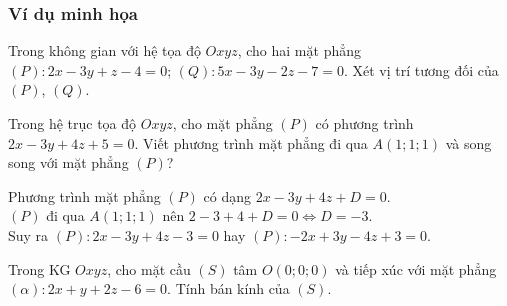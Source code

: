 \subsubsection{Ví dụ minh họa}
\begin{vd}%
	Trong không gian với hệ tọa độ $ Oxyz $, cho hai mặt phẳng $ (P)\colon 2x-3y+z-4=0 $; $ (Q)\colon 5x-3y-2z-7=0 $. Xét vị trí tương đối của $ (P) $, $ (Q) $.
\end{vd}
\begin{vd}%
	
	Trong hệ trục tọa độ $Oxyz$, cho mặt phẳng $(P)$ có phương trình $2x-3y+4z+5=0$. Viết phương trình mặt phẳng đi qua $A(1; 1;1)$ và song song với mặt phẳng $(P)$?

	\loigiai
	{
		Phương trình mặt phẳng $(P)$ có dạng $2x-3y+4z+D=0$.\\
		$(P)$ đi qua $A(1; 1; 1)$ nên $2-3+4+D=0\Leftrightarrow D=-3$.\\
		Suy ra $(P):2x-3y+4z-3=0$ hay $(P):-2x+3y-4z+3=0$.
	}
\end{vd}
\begin{vd}%
	Trong KG $Oxyz$, cho mặt cầu $(S)$ tâm $O(0;0;0)$ và tiếp xúc với mặt phẳng $(\alpha)\colon 2x+y+2z-6=0$. Tính bán kính của $(S)$.
\end{vd}

